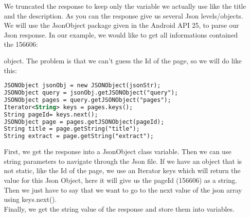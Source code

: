 We truncated the response to keep only the variable we actually use like the title and the description. As you can the response give us several Json levels/objects. We will use the JsonObject package given in the Android API 25, to parse our Json response. In our example, we would like to get all informations contained the 156606:{ object. The problem is that we can't guess the Id of the page, so we will do like this:
\begin{lstlisting}[language=XML, basicstyle=\scriptsize]
JSONObject jsonObj = new JSONObject(jsonStr);
JSONObject query = jsonObj.getJSONObject("query");
JSONObject pages = query.getJSONObject("pages");
Iterator<String> keys = pages.keys();
String pageId= keys.next();
JSONObject page = pages.getJSONObject(pageId);
String title = page.getString("title");
String extract = page.getString("extract");
\end{lstlisting}
First, we get the response into a JsonObject class variable. Then we can use string parameters to navigate through the Json file. If we have an object that is not static, like the Id of the page, we use an Iterator keys which will return the value for this Json Object, here it will give us the pageId (156606) as a string. Then we just have to say that we want to go to the next value of the json array using keys.next().\\
Finally, we get the string value of the response and store them into variables.

}
